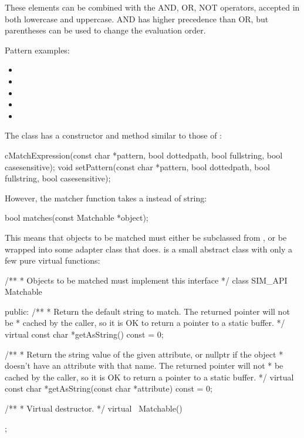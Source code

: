 These elements can be combined with the AND, OR, NOT operators, accepted in
both lowercase and uppercase. AND has higher precedence than OR, but
parentheses can be used to change the evaluation order.

Pattern examples:

\begin{itemize}
 \item {}
 \item {}
 \item {}
 \item {}
 \item {}
\end{itemize}

The  class has a constructor and 
method similar to those of :

\begin{cpp}
cMatchExpression(const char *pattern, bool dottedpath, bool fullstring,
                bool casesensitive);
void setPattern(const char *pattern, bool dottedpath, bool fullstring,
                bool casesensitive);
\end{cpp}

However, the matcher function takes a 
instead of string:

\begin{cpp}
bool matches(const Matchable *object);
\end{cpp}

This means that objects to be matched must either be subclassed from
, or be wrapped into some adapter class
that does.  is a small abstract class
with only a few pure virtual functions:

\begin{cpp}
/**
 * Objects to be matched must implement this interface
 */
class SIM_API Matchable
{
  public:
    /**
     * Return the default string to match. The returned pointer will not be
     * cached by the caller, so it is OK to return a pointer to a static buffer.
     */
    virtual const char *getAsString() const = 0;

    /**
     * Return the string value of the given attribute, or nullptr if the object
     * doesn't have an attribute with that name. The returned pointer will not
     * be cached by the caller, so it is OK to return a pointer to a static buffer.
     */
    virtual const char *getAsString(const char *attribute) const = 0;

    /**
     * Virtual destructor.
     */
    virtual ~Matchable() {}
};
\end{cpp}

